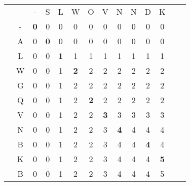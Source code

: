 \documentclass[11pt]{article}
\begin{document}
\begin{center}
\begin{tabular}{cc|*{12}{c}}
    &   & - & S & L & W & O & V & N & N & D & K  \\ \cline{2-12}
    & - & \textbf{0} & 0 & 0 & 0 & 0 & 0 & 0 & 0 & 0 & 0 \\
    & A & 0 & \textbf{0} & 0 & 0 & 0 & 0 & 0 & 0 & 0 & 0 \\
    & L & 0 & 0 & \textbf{1} & 1 & 1 & 1 & 1 & 1 & 1 & 1 \\
    & W & 0 & 0 & 1 & \textbf{2} & 2 & 2 & 2 & 2 & 2 & 2 \\
    & G & 0 & 0 & 1 & 2 & 2 & 2 & 2 & 2 & 2 & 2 \\
    & Q & 0 & 0 & 1 & 2 & \textbf{2} & 2 & 2 & 2 & 2 & 2 \\
    & V & 0 & 0 & 1 & 2 & 2 & \textbf{3} & 3 & 3 & 3 & 3 \\
    & N & 0 & 0 & 1 & 2 & 2 & 3 & \textbf{4} & 4 & 4 & 4 \\
    & B & 0 & 0 & 1 & 2 & 2 & 3 & 4 & 4 & \textbf{4} & 4 \\
    & K & 0 & 0 & 1 & 2 & 2 & 3 & 4 & 4 & 4 & \textbf{5} \\
    & B & 0 & 0 & 1 & 2 & 2 & 3 & 4 & 4 & 4 & 5 \\
    
\end{tabular}
\end{center}
\end{document}
